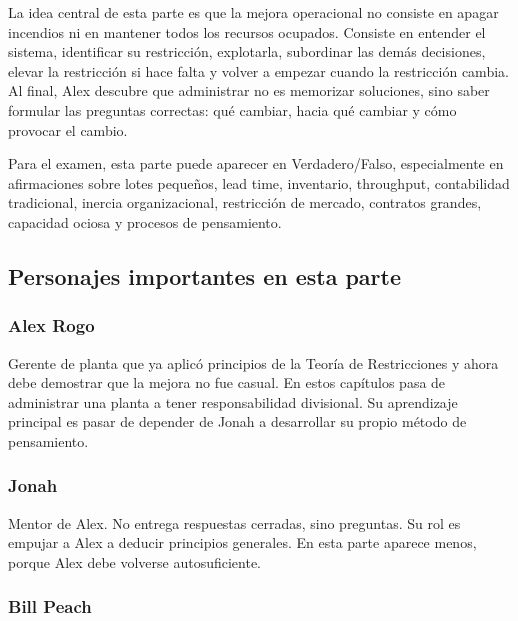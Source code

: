 \documentclass[
  11pt,
]{article}
\begin{document}
La idea central de esta parte es que la mejora operacional no consiste
en apagar incendios ni en mantener todos los recursos ocupados. Consiste
en entender el sistema, identificar su restricción, explotarla,
subordinar las demás decisiones, elevar la restricción si hace falta y
volver a empezar cuando la restricción cambia. Al final, Alex descubre
que administrar no es memorizar soluciones, sino saber formular las
preguntas correctas: qué cambiar, hacia qué cambiar y cómo provocar el
cambio.

Para el examen, esta parte puede aparecer en Verdadero/Falso,
especialmente en afirmaciones sobre lotes pequeños, lead time,
inventario, throughput, contabilidad tradicional, inercia
organizacional, restricción de mercado, contratos grandes, capacidad
ociosa y procesos de pensamiento.

\hypertarget{personajes-importantes-en-esta-parte}{%
\subsection{Personajes importantes en esta
parte}\label{personajes-importantes-en-esta-parte}}

\hypertarget{alex-rogo}{%
\subsubsection{Alex Rogo}\label{alex-rogo}}

Gerente de planta que ya aplicó principios de la Teoría de Restricciones
y ahora debe demostrar que la mejora no fue casual. En estos capítulos
pasa de administrar una planta a tener responsabilidad divisional. Su
aprendizaje principal es pasar de depender de Jonah a desarrollar su
propio método de pensamiento.

\hypertarget{jonah}{%
\subsubsection{Jonah}\label{jonah}}

Mentor de Alex. No entrega respuestas cerradas, sino preguntas. Su rol
es empujar a Alex a deducir principios generales. En esta parte aparece
menos, porque Alex debe volverse autosuficiente.

\hypertarget{bill-peach}{%
\subsubsection{Bill Peach}\label{bill-peach}}
\end{document}
